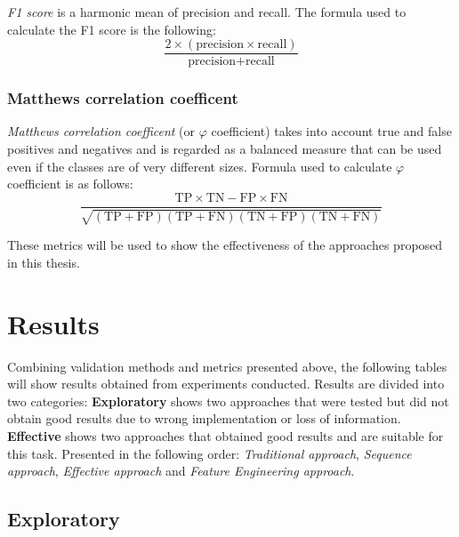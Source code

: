                 \textit{F1 score} is a harmonic mean of precision and recall. The formula used to calculate the F1 score is the following:
                \begin{equation}
                    \frac{ 2 \times (\text{precision} \times \text{recall})}{\text{precision} + \text{recall}}
                \end{equation}

            \subsubsection{Matthews correlation coefficent} 

                \textit{Matthews correlation coefficent} (or $\varphi$ coefficient) takes into account true and false positives and negatives and is regarded as a balanced measure that can be used even if the classes are of very different sizes. Formula used to calculate $\varphi$ coefficient is as follows: 
                \begin{equation}
                    \frac{\text{TP} \times \text{TN} - \text{FP} \times \text{FN}}{\sqrt{(\text{TP} + \text{FP})(\text{TP} + \text{FN})(\text{TN} + \text{FP})(\text{TN} + \text{FN})}}
                \end{equation}

            These metrics will be used to show the effectiveness of the approaches proposed in this thesis.
    
\section{Results}
        
        Combining validation methods and metrics presented above, the following tables will show results obtained from experiments conducted. Results are divided into two categories: \textbf{Exploratory} shows two approaches that were tested but did not obtain good results due to wrong implementation or loss of information. \textbf{Effective} shows two approaches that obtained good results and are suitable for this task. Presented in the following order: \textit{Traditional approach}, \textit{Sequence approach}, \textit{Effective approach} and \textit{Feature Engineering approach}. 

        \subsection{Exploratory}

